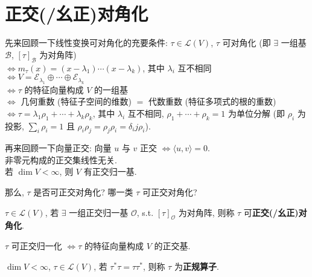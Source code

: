\documentclass{note}
\begin{document}
\section{正交(/幺正)对角化}
先来回顾一下线性变换可对角化的充要条件: $\tau\in\mathcal{L}(V)$, $\tau$ 可对角化 (即 $\exists$ 一组基 $\mathcal{B}$, $[\tau]_{\mathcal{B}}$ 为对角阵)\\
$\Longleftrightarrow m_{\tau}(x)=(x-\lambda_1)\cdots(x-\lambda_k)$, 其中 $\lambda_i$ 互不相同\\
$\Longleftrightarrow V=\mathcal{E}_{\lambda_1}\oplus\cdots\oplus\mathcal{E}_{\lambda_k}$\\
$\Longleftrightarrow\tau$ 的特征向量构成 $V$ 的一组基\\
$\Longleftrightarrow$ 几何重数 (特征子空间的维数) $=$ 代数重数 (特征多项式的根的重数)\\
$\Longleftrightarrow\tau=\lambda_1\rho_1+\cdots+\lambda_k\rho_k$, 其中 $\lambda_i$ 互不相同, $\rho_1+\cdots+\rho_k=1$ 为单位分解 (即 $\rho_i$ 为投影, $\sum_i\rho_i=1$ 且 $\rho_i\rho_j=\rho_j\rho_i=\delta_ij\rho_i$).

再来回顾一下向量正交: 向量 $u$ 与 $v$ 正交 $\Longleftrightarrow\langle u,v\rangle=0$.\\
非零元构成的正交集线性无关.\\
若 $\dim V<\infty$, 则 $V$ 有正交归一基.

那么, $\tau$ 是否可正交对角化? 哪一类 $\tau$ 可正交对角化?
\begin{df}[正交(/幺正)对角化]
    $\tau\in\mathcal{L}(V)$, 若 $\exists$ 一组正交归一基 $\mathcal{O}$, s.t. $[\tau]_{\mathcal{O}}$ 为对角阵, 则称 $\tau$ 可\textbf{正交(/幺正)对角化}.
\end{df}

\begin{thm}
    $\tau$ 可正交归一化 $\Longleftrightarrow\tau$ 的特征向量构成 $V$ 的正交基.
\end{thm}

\begin{df}[正规算子]
    $\dim V<\infty$, $\tau\in\mathcal{L}(V)$, 若 $\tau^*\tau=\tau\tau^*$, 则称 $\tau$ 为\textbf{正规算子}.
\end{df}
\end{document}
